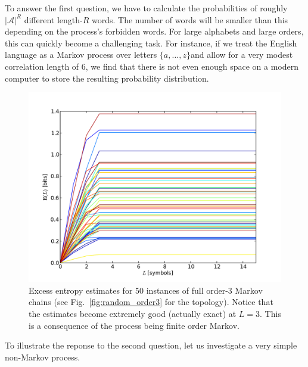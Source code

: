 To answer the first question, we have to calculate the probabilities of roughly $|\mathcal{A}|^R$ different length-$R$ words. The number of words will be smaller than this depending on the process's forbidden words. For large alphabets and large orders, this can quickly become a challenging task. For instance, if we treat the English language as a Markov process over letters $\{a, \ldots, z\}$and allow for a very modest correlation length of 6, we find that there is not even enough space on a modern computer to store the resulting probability distribution.

\begin{figure}[h!]
\centering
\includegraphics[scale = 0.45]{../chapter1/figures/scripts/E_random_order3}
\caption{Excess entropy estimates for 50 instances of full order-3 Markov chains (see Fig.~\ref{fig:random_order3} for the topology). Notice that the estimates become extremely good (actually exact) at $L=3$. This is a consequence of the process being finite order Markov.}
\label{fig:E_random_order3}
\end{figure}

To illustrate the reponse to the second question, let us investigate a very simple non-Markov process.

